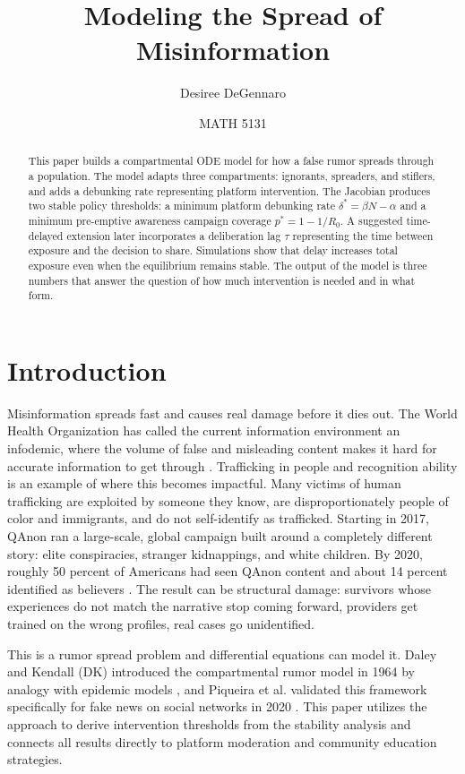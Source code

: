 \documentclass[12pt]{article}
\title{Modeling the Spread of Misinformation}
\author{Desiree DeGennaro}
\date{MATH 5131}
\begin{document}
\maketitle

\begin{abstract}
This paper builds a compartmental ODE model for how a false rumor spreads
through a population. The model
adapts three compartments: ignorants,
spreaders, and stiflers, and adds a debunking rate representing platform
intervention. The Jacobian produces two stable
policy thresholds: a minimum platform debunking rate $\delta^* = \beta N -
\alpha$ and a minimum pre-emptive awareness campaign coverage $p^* = 1 -
1/R_0$. A suggested time-delayed extension later incorporates a deliberation lag $\tau$
representing the time between exposure and the decision to share.
Simulations show that delay increases total
exposure even when the equilibrium remains stable. The output of the model
is three numbers that answer the question of how much intervention
is needed and in what form.
\end{abstract}

\section{Introduction}

Misinformation spreads fast and causes real damage before it dies out. The
World Health Organization has called the current information environment an
infodemic, where the volume of false and misleading content makes it hard
for accurate information to get through \cite{who2022}. Trafficking in people and recognition ability is
an example of where this becomes impactful. Many victims of human trafficking are
exploited by someone they know, are disproportionately people of color and
immigrants, and do not self-identify as trafficked. Starting in 2017, QAnon
ran a large-scale, global campaign built around a completely different story: elite
conspiracies, stranger kidnappings, and white children. By 2020, roughly 50
percent of Americans had seen QAnon content and about 14 percent identified
as believers \cite{prakash2022}. The result can be structural damage: survivors
whose experiences do not match the narrative stop coming forward, providers
get trained on the wrong profiles, real cases go unidentified.

This is a rumor spread problem and differential equations can model it.
Daley and Kendall (DK) introduced the compartmental rumor model in 1964 by
analogy with epidemic models \cite{daley1964}, and Piqueira et al. 
validated this framework specifically for fake news on social networks in 2020
\cite{piqueira2020}. This paper utilizes the approach to derive intervention thresholds from the stability analysis and connects all results directly to platform moderation and
community education strategies.
\end{document}
